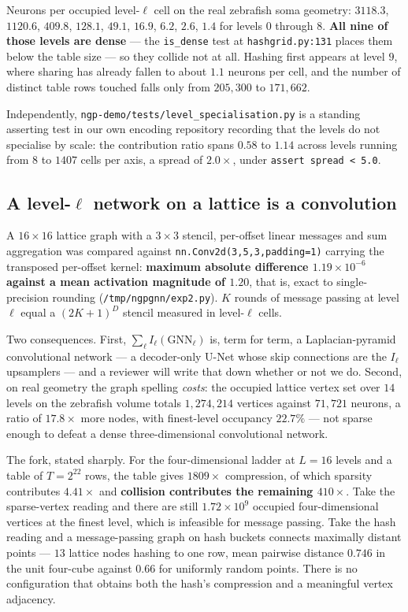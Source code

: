 \documentclass[11pt,a4paper]{article}
\begin{document}
Neurons per occupied level-$\ell$ cell on the real zebrafish soma geometry: $3118.3$,
$1120.6$, $409.8$, $128.1$, $49.1$, $16.9$, $6.2$, $2.6$, $1.4$ for levels $0$ through $8$.
\textbf{All nine of those levels are dense} --- the \texttt{is\_dense} test at
\texttt{hashgrid.py:131} places them below the table size --- so they collide not at all.
Hashing first appears at level $9$, where sharing has already fallen to about $1.1$ neurons
per cell, and the number of distinct table rows touched falls only from $205{,}300$ to
$171{,}662$.

Independently, \texttt{ngp-demo/tests/level\_specialisation.py} is a standing asserting test
in our own encoding repository recording that the levels do not specialise by scale: the
contribution ratio spans $0.58$ to $1.14$ across levels running from $8$ to $1407$ cells per
axis, a spread of $2.0\times$, under \texttt{assert spread < 5.0}.

\subsection{A level-\texorpdfstring{$\ell$}{l} network on a lattice is a convolution}

A $16\times16$ lattice graph with a $3\times3$ stencil, per-offset linear messages and sum
aggregation was compared against \texttt{nn.Conv2d(3,5,3,padding=1)} carrying the transposed
per-offset kernel: \textbf{maximum absolute difference $1.19\times10^{-6}$ against a mean
activation magnitude of $1.20$}, that is, exact to single-precision rounding
(\texttt{/tmp/ngpgnn/exp2.py}). $K$ rounds of message passing at level $\ell$ equal a
$(2K+1)^D$ stencil measured in level-$\ell$ cells.

Two consequences. First, $\sum_\ell I_\ell(\mathrm{GNN}_\ell)$ is, term for term, a
Laplacian-pyramid convolutional network --- a decoder-only U-Net whose skip connections are
the $I_\ell$ upsamplers --- and a reviewer will write that down whether or not we do.
Second, on real geometry the graph spelling \emph{costs}: the occupied lattice vertex set
over $14$ levels on the zebrafish volume totals $1{,}274{,}214$ vertices against $71{,}721$
neurons, a ratio of $17.8\times$ more nodes, with finest-level occupancy $22.7\%$ --- not
sparse enough to defeat a dense three-dimensional convolutional network.

The fork, stated sharply. For the four-dimensional ladder at $L=16$ levels and a table of
$T = 2^{22}$ rows, the table gives $1809\times$ compression, of which sparsity contributes
$4.41\times$ and \textbf{collision contributes the remaining $410\times$}. Take the
sparse-vertex reading and there are still $1.72\times10^{9}$ occupied four-dimensional
vertices at the finest level, which is infeasible for message passing. Take the hash reading
and a message-passing graph on hash buckets connects maximally distant points --- $13$
lattice nodes hashing to one row, mean pairwise distance $0.746$ in the unit four-cube
against $0.66$ for uniformly random points. There is no configuration that obtains both the
hash's compression and a meaningful vertex adjacency.
\end{document}
